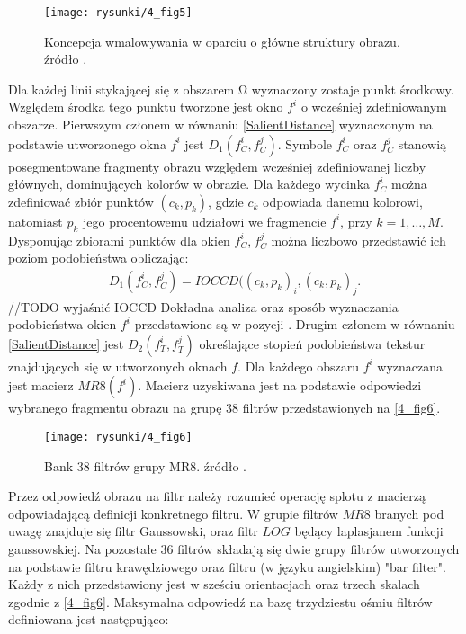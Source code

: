 \documentclass[12pt, twoside, openany]{report}
\theoremstyle{definition}
\begin{document}
\begin{figure}[!h]
	\centering
	\texttt{[image: rysunki/4\_fig5]}
	\caption{Koncepcja wmalowywania w oparciu o główne struktury obrazu. źródło \cite{StructurePropagationManual}.}
	\label{4_fig5} 
\end{figure}
Dla każdej linii stykającej się z obszarem $\mathrm{\Omega }$ wyznaczony zostaje punkt środkowy. Względem środka tego punktu tworzone jest okno  $f^i$ o wcześniej zdefiniowanym obszarze. Pierwszym członem w równaniu \eqref{SalientDistance} wyznaczonym na podstawie utworzonego okna $f^i$ jest $D_1\left(f^i_C,f^j_C\right)$. Symbole $f^i_C$ oraz $f^j_C$ stanowią posegmentowane fragmenty obrazu względem wcześniej zdefiniowanej liczby głównych, dominujących kolorów w obrazie. Dla każdego wycinka $f^i_C$ można zdefiniować zbiór punktów $(c_k,p_k)$, gdzie $c_k$ odpowiada danemu kolorowi, natomiast $p_k$ jego procentowemu udziałowi we fragmencie $f^i$, przy $k=1,\dots ,M$. Dysponując zbiorami punktów dla okien $f^i_C$,$\ f^j_C$ można liczbowo przedstawić ich poziom podobieństwa obliczając: 
\begin{align}
D_1\left(f^i_C,f^j_C\right)=IOCCD({\left(c_k,p_k\right)}_i,{\left(c_k,p_k\right)}_j.
\label{colDistance}
\end{align}
//TODO wyjaśnić IOCCD
Dokładna analiza oraz sposób wyznaczania podobieństwa okien $f^i$ przedstawione są w pozycji \cite{chen2005adaptive}.
Drugim członem w równaniu \eqref{SalientDistance} jest $D_2\left(f^i_T,f^j_T\right)$ określające stopień podobieństwa tekstur znajdujących się w utworzonych oknach $f$. Dla każdego obszaru $f^i$ wyznaczana jest macierz $MR8(f^i)$. Macierz uzyskiwana jest na podstawie odpowiedzi wybranego fragmentu obrazu na grupę 38 filtrów przedstawionych na \autoref{4_fig6}.
\begin{figure}[!h]
	\centering
	\texttt{[image: rysunki/4\_fig6]}
	\caption{Bank 38 filtrów grupy MR8. źródło \cite{varma2009statistical}.}
\label{4_fig6}
\end{figure}
Przez odpowiedź obrazu na filtr należy rozumieć operację splotu z macierzą odpowiadającą definicji konkretnego filtru. W grupie filtrów $MR8$ branych pod uwagę znajduje się filtr Gaussowski, oraz filtr $LOG$ będący laplasjanem funkcji gaussowskiej.
Na pozostałe 36 filtrów składają się dwie grupy filtrów utworzonych na podstawie filtru krawędziowego oraz filtru (w języku angielskim) "bar filter". Każdy z nich przedstawiony jest w sześciu orientacjach oraz trzech skalach zgodnie z \autoref{4_fig6}. Maksymalna odpowiedź na bazę trzydziestu ośmiu filtrów definiowana jest następująco:
\end{document}
